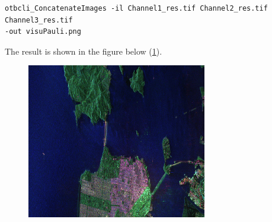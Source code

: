 \begin{verbatim} 
otbcli_ConcatenateImages -il Channel1_res.tif Channel2_res.tif Channel3_res.tif
-out visuPauli.png 
\end{verbatim}

The result is shown in the figure below (\ref{fig:colorfrisco}).

\begin{figure}[h!]
\center
\includegraphics[width=0.7\textwidth]{../Art/visuPauli.png}
\label{fig:colorfrisco}
\end{figure}
